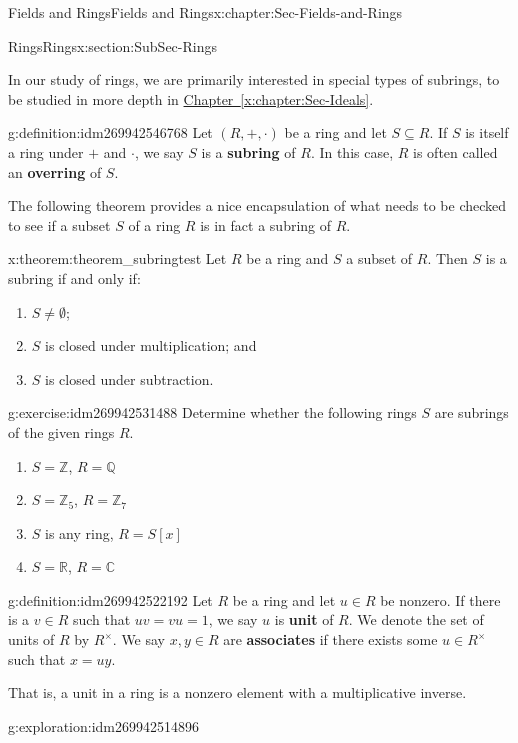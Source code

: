 \documentclass[oneside,10pt,]{book}
\newcommand{\terminology}[1]{\textbf{#1}}
\numberwithin{equation}{section}
\def\C{{\mathbb C}}
\def\Z{{\mathbb Z}}
\def\Q{{\mathbb Q}}
\def\R{{\mathbb R}}
\begin{document}
\begin{chapterptx}{Fields and Rings}{}{Fields and Rings}{}{}{x:chapter:Sec-Fields-and-Rings}
\begin{sectionptx}{Rings}{}{Rings}{}{}{x:section:SubSec-Rings}
\par
In our study of rings, we are primarily interested in special types of subrings, to be studied in more depth in \hyperref[x:chapter:Sec-Ideals]{Chapter~\ref{x:chapter:Sec-Ideals}}.%
\begin{definition}{}{g:definition:idm269942546768}%
Let \((R,+,\cdot)\) be a ring and let \(S\subseteq R\). If \(S\) is itself a ring under \(+\) and \(\cdot\), we say \(S\) is a \terminology{subring} of \(R\). In this case, \(R\) is often called an \terminology{overring} of \(S\).%
\end{definition}
The following theorem provides a nice encapsulation of what needs to be checked to see if a subset \(S\) of a ring \(R\) is in fact a subring of \(R\).%
\begin{theorem}{}{}{x:theorem:theorem_subringtest}%
Let \(R\) be a ring and \(S\) a subset of \(R\). Then \(S\) is a subring if and only if:%
\begin{enumerate}
\item{}\(S\ne \emptyset\);%
\item{}\(S\) is closed under multiplication; and%
\item{}\(S\) is closed under subtraction.%
\end{enumerate}
%
\end{theorem}
\begin{inlineexercise}{}{g:exercise:idm269942531488}%
Determine whether the following rings \(S\) are subrings of the given rings \(R\).%
\begin{enumerate}
\item{}\(S = \Z\), \(R = \Q\)%
\item{}\(S = \Z_{5}\), \(R = \Z_{7}\)%
\item{}\(S\) is any ring, \(R = S[x]\)%
\item{}\(S = \R\), \(R = \C\)%
\end{enumerate}
%
\end{inlineexercise}
\begin{definition}{}{g:definition:idm269942522192}%
Let \(R\) be a ring and let \(u\in R\) be nonzero. If there is a \(v\in R\) such that \(uv = vu = 1\), we say \(u\) is \terminology{unit} of \(R\). We denote the set of units of \(R\) by \(R^\times\). We say \(x,y\in R\) are \terminology{associates} if there exists some \(u\in R^\times\) such that \(x = uy\).%
\end{definition}
That is, a unit in a ring is a nonzero element with a multiplicative inverse.%
\begin{exploration}{}{g:exploration:idm269942514896}%

\end{exploration}
\end{sectionptx}
\end{chapterptx}
\end{document}
